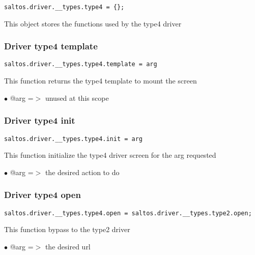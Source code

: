 \documentclass[a4paper]{article}
\begin{document}
\begin{lstlisting}
saltos.driver.__types.type4 = {};
\end{lstlisting}

This object stores the functions used by the type4 driver

\hypertarget{toc755}{}
\subsubsection{Driver type4 template}

\begin{lstlisting}
saltos.driver.__types.type4.template = arg
\end{lstlisting}

This function returns the type4 template to mount the screen

\begin{compactitem}
\item[\color{myblue}$\bullet$] @arg =$>$ unused at this scope
\end{compactitem}

\hypertarget{toc756}{}
\subsubsection{Driver type4 init}

\begin{lstlisting}
saltos.driver.__types.type4.init = arg
\end{lstlisting}

This function initialize the type4 driver screen for the arg requested

\begin{compactitem}
\item[\color{myblue}$\bullet$] @arg =$>$ the desired action to do
\end{compactitem}

\hypertarget{toc757}{}
\subsubsection{Driver type4 open}

\begin{lstlisting}
saltos.driver.__types.type4.open = saltos.driver.__types.type2.open;
\end{lstlisting}

This function bypass to the type2 driver

\begin{compactitem}
\item[\color{myblue}$\bullet$] @arg =$>$ the desired url
\end{compactitem}
\end{document}
